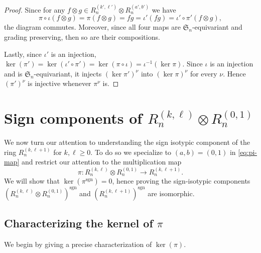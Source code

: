 \documentclass[11pt, reqno]{amsart}
\theoremstyle{definition}
\theoremstyle{remark}
\numberwithin{equation}{section}
\newcommand{\0}{\emptyset}
\renewcommand{\S}{\mathfrak{S}}
\DeclareMathOperator{\sgn}{sgn}
\begin{document}
\begin{proof}
    Since for any $f \otimes g \in  R_n^{(k',\ell')} \otimes R_n^{(a',b')}$ 
    we have 
    \[
        \pi \circ \iota(f \otimes g) = 
        \pi(f \otimes g) = 
        fg = 
        {\iota'}(fg) = 
        {\iota'}\circ {\pi'}(f \otimes g), 
    \]
    the diagram commutes. 
    Moreover, since all four maps are $\S_n$-equivariant and grading preserving, 
    then so are their compositions. 

    Lastly, since $\iota'$ is an injection,  $\ker(\pi') = \ker(\iota' \circ \pi') = \ker(\pi \circ \iota) = \iota^{-1}(\ker \pi)$.
    Since $\iota$ is an injection and is $\S_n$-equivariant, it injects $(\ker \pi')^\nu$ into $(\ker \pi)^\nu$ for every $\nu$. Hence $(\pi')^\nu$ is injective whenever $\pi^\nu$ is.
\end{proof}

\section{Sign components of \texorpdfstring{$R_n^{(k,\ell)} \otimes R_n^{(0,1)}$}{Rn(k,l)xRn(0,1)}}\label{sec:main}

We now turn our attention to understanding the sign isotypic component of the ring $R_n^{(k,\ell+1)}$ for $k,\ell \geq 0$. To do so we specialize to $(a,b)=(0,1)$ in \eqref{eq:pi-map} and restrict our attention to the multiplication map 
\[
    \pi: R_n^{(k,\ell)} \otimes R_n^{(0,1)} \to R_n^{(k,\ell+1)}. 
\]
We will show that $\ker(\pi^{\sgn}) =0$, hence proving the sign-isotypic components
$\left(R_n^{(k,\ell)} \otimes R_n^{(0,1)}\right)^{\sgn}$ and $\left(R_n^{(k,\ell+1)}\right)^{\sgn}$ are isomorphic.

\subsection{Characterizing the kernel of \texorpdfstring{$\pi$}{pi}}\label{subsec:kernel-pi}
We begin by giving a precise characterization of $\ker(\pi)$.
\end{document}

